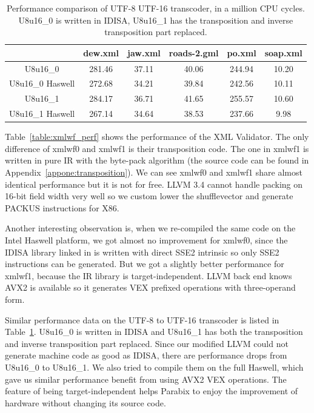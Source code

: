 \begin{table}[h]
\centering
\begin{tabular}{|c|c|c|c|c|c|}
\hline
 & dew.xml & jaw.xml & roads-2.gml & po.xml & soap.xml \\ \hline
 U8u16\_0         & 281.46  & 37.11   & 40.06       & 244.94 & 10.20    \\ \hline
 U8u16\_0 Haswell & 272.68  & 34.21   & 39.84       & 242.56 & 10.11    \\ \hline
 U8u16\_1         & 284.17  & 36.71   & 41.65       & 255.57 & 10.60     \\ \hline
 U8u16\_1 Haswell & 267.14  & 34.64   & 38.53       & 237.66 & 9.98     \\ \hline
 \end{tabular}
 \caption[Performance comparison of UTF-8 UTF-16 Transcoder]{Performance comparison of UTF-8 UTF-16 transcoder, in a million CPU cycles. U8u16\_0 is written in IDISA, U8u16\_1 has the transposition and inverse transposition part replaced.}
 \label{table:u8u16_perf}
 \end{table}

Table~\ref{table:xmlwf_perf} shows the performance of the XML Validator. The only difference of xmlwf0 and xmlwf1 is their transposition code. The one in xmlwf1 is written in pure IR with the byte-pack algorithm (the source code can be found in Appendix~\ref{appone:transposition}). We can see xmlwf0 and xmlwf1 share almost identical performance but it is not for free. LLVM 3.4 cannot handle packing on 16-bit field width very well so we custom lower the shufflevector and generate PACKUS instructions for X86.

Another interesting observation is, when we re-compiled the same code on the Intel Haswell platform, we got almost no improvement for xmlwf0, since the IDISA library linked in is written with direct SSE2 intrinsic so only SSE2 instructions can be generated. But we got a slightly better performance for xmlwf1, because the IR library is target-independent. LLVM back end knows AVX2 is available so it generates VEX prefixed operations with three-operand form.

Similar performance data on the UTF-8 to UTF-16 transcoder is listed in Table~\ref{table:u8u16_perf}. U8u16\_0 is written in IDISA and U8u16\_1 has both the transposition and inverse transposition part replaced. Since our modified LLVM could not generate machine code as good as IDISA, there are performance drops from U8u16\_0 to U8u16\_1. We also tried to compile them on the full Haswell, which gave us similar performance benefit from using AVX2 VEX operations. The feature of being target-independent helps Parabix to enjoy the improvement of hardware without changing its source code.

